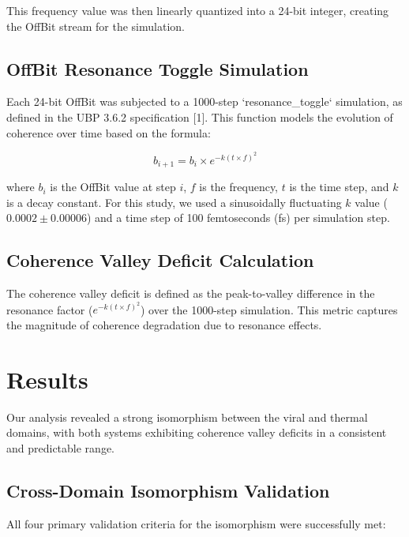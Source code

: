 \documentclass[11pt,a4paper]{article}
\begin{document}
This frequency value was then linearly quantized into a 24-bit integer, creating the OffBit stream for the simulation.

\subsection{OffBit Resonance Toggle Simulation}

Each 24-bit OffBit was subjected to a 1000-step `resonance_toggle` simulation, as defined in the UBP 3.6.2 specification [1]. This function models the evolution of coherence over time based on the formula:

\begin{equation}
    b_{i+1} = b_i \times e^{-k(t \times f)^2}
\end{equation}

where $b_i$ is the OffBit value at step $i$, $f$ is the frequency, $t$ is the time step, and $k$ is a decay constant. For this study, we used a sinusoidally fluctuating $k$ value ($0.0002 \pm 0.00006$) and a time step of 100 femtoseconds (fs) per simulation step.

\subsection{Coherence Valley Deficit Calculation}

The coherence valley deficit is defined as the peak-to-valley difference in the resonance factor ($e^{-k(t \times f)^2}$) over the 1000-step simulation. This metric captures the magnitude of coherence degradation due to resonance effects.

\section{Results}

Our analysis revealed a strong isomorphism between the viral and thermal domains, with both systems exhibiting coherence valley deficits in a consistent and predictable range.

\subsection{Cross-Domain Isomorphism Validation}

All four primary validation criteria for the isomorphism were successfully met:
\end{document}
